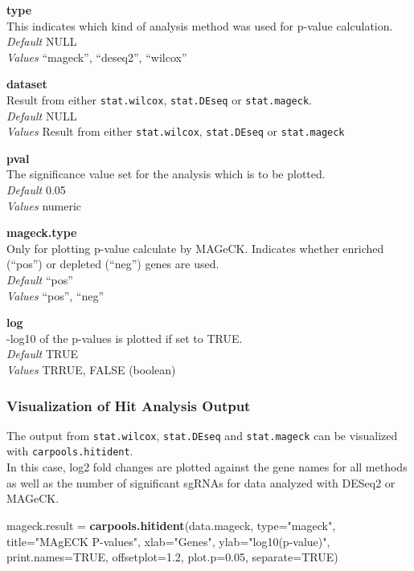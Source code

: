 \documentclass[]{article}
\newenvironment{Shaded}{\begin{snugshade}}{\end{snugshade}}
\newcommand{\KeywordTok}[1]{\textcolor[rgb]{0.13,0.29,0.53}{\textbf{{#1}}}}
\newcommand{\DataTypeTok}[1]{\textcolor[rgb]{0.13,0.29,0.53}{{#1}}}
\newcommand{\FloatTok}[1]{\textcolor[rgb]{0.00,0.00,0.81}{{#1}}}
\newcommand{\StringTok}[1]{\textcolor[rgb]{0.31,0.60,0.02}{{#1}}}
\newcommand{\OtherTok}[1]{\textcolor[rgb]{0.56,0.35,0.01}{{#1}}}
\newcommand{\NormalTok}[1]{{#1}}
\begin{document}
\textbf{type}\\
This indicates which kind of analysis method was used for p-value
calculation.\\
\emph{Default} NULL\\
\emph{Values} ``mageck'', ``deseq2'', ``wilcox''

\textbf{dataset}\\
Result from either \texttt{stat.wilcox}, \texttt{stat.DEseq} or
\texttt{stat.mageck}.\\
\emph{Default} NULL\\
\emph{Values} Result from either \texttt{stat.wilcox},
\texttt{stat.DEseq} or \texttt{stat.mageck}

\textbf{pval}\\
The significance value set for the analysis which is to be plotted.\\
\emph{Default} 0.05\\
\emph{Values} numeric

\textbf{mageck.type}\\
Only for plotting p-value calculate by MAGeCK. Indicates whether
enriched (``pos'') or depleted (``neg'') genes are used.\\
\emph{Default} ``pos''\\
\emph{Values} ``pos'', ``neg''

\textbf{log}\\
-log10 of the p-values is plotted if set to TRUE.\\
\emph{Default} TRUE\\
\emph{Values} TRRUE, FALSE (boolean)

\subsubsection{Visualization of Hit Analysis
Output}\label{visualization-of-hit-analysis-output}

The output from \texttt{stat.wilcox}, \texttt{stat.DEseq} and
\texttt{stat.mageck} can be visualized with
\texttt{carpools.hitident}.\\
In this case, log2 fold changes are plotted against the gene names for
all methods as well as the number of significant sgRNAs for data
analyzed with DESeq2 or MAGeCK.

\begin{Shaded}
\begin{Highlighting}[]
\NormalTok{mageck.result =}\StringTok{ }\KeywordTok{carpools.hitident}\NormalTok{(data.mageck, }\DataTypeTok{type=}\StringTok{"mageck"}\NormalTok{,}
      \DataTypeTok{title=}\StringTok{"MAgECK P-values"}\NormalTok{, }\DataTypeTok{xlab=}\StringTok{"Genes"}\NormalTok{, }\DataTypeTok{ylab=}\StringTok{"log10(p-value)"}\NormalTok{,}
      \DataTypeTok{print.names=}\OtherTok{TRUE}\NormalTok{, }\DataTypeTok{offsetplot=}\FloatTok{1.2}\NormalTok{, }\DataTypeTok{plot.p=}\FloatTok{0.05}\NormalTok{, }\DataTypeTok{separate=}\OtherTok{TRUE}\NormalTok{)}
\end{Highlighting}
\end{Shaded}
\end{document}

